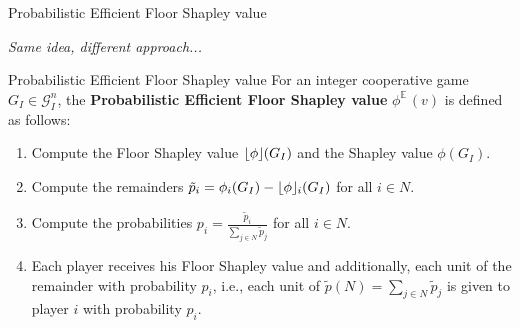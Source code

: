 \documentclass{beamer}
\newcommand{\floor}[1]{\left\lfloor #1 \right\rfloor}
\newcommand{\floorphi}{\ensuremath{\floor{\phi}\hspace{-0.5ex}}}
\DeclareMathOperator{\E}{\mathbb{E}\,}
\begin{document}
\begin{frame}{Probabilistic Efficient Floor Shapley value}
    \pause
    
    \textit{Same idea, different approach...}

    \pause

    \begin{block}{Probabilistic Efficient Floor Shapley value}
        \pause
        For an integer cooperative game $G_I \in \mathcal{G}_I^n$, the \textbf{Probabilistic Efficient Floor Shapley value} $\phi^{\E}(v)$ is defined as follows:
        \begin{enumerate}
            \pause
            \item Compute the Floor Shapley value $\floorphi(G_I)$ and the Shapley value $\phi(G_I)$.
            \pause
            \item Compute the remainders $\tilde{p}_i = \phi_i(G_I) - \floorphi_i(G_I)$ for all $i \in N$.
            \pause
            \item Compute the probabilities $p_i = \frac{\tilde{p}_i}{\sum_{j \in N} \tilde{p}_j}$ for all $i \in N$.
            \pause
            \item Each player receives his Floor Shapley value and additionally, each unit of the remainder with probability $p_i$, i.e., each unit of $\tilde{p}(N)=\sum_{j \in N} \tilde{p}_j$ is given to player $i$ with probability $p_i$.
        \end{enumerate}
    \end{block}
\end{frame}


\end{document}
